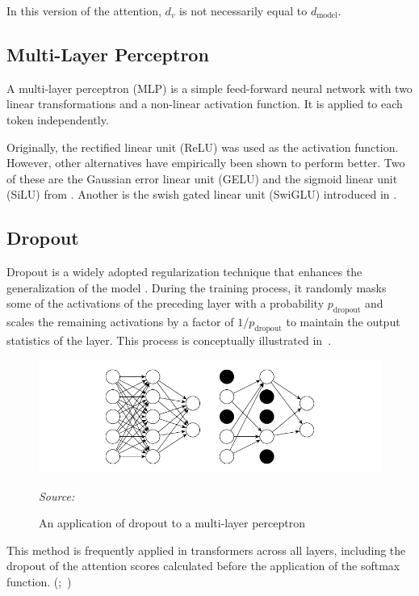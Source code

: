 In this version of the attention, \(d_v\) is not necessarily equal to \(d_{\mathrm{model}}\).

\subsection{Multi-Layer Perceptron}

A multi-layer perceptron (MLP) is a simple feed-forward neural network with two linear transformations and a non-linear activation function. It is applied to each token independently.

Originally, the rectified linear unit (ReLU) was used as the activation function. However, other alternatives have empirically been shown to perform better. Two of these are the Gaussian error linear unit (GELU) and the sigmoid linear unit (SiLU) from \citet{hendrycks2016}. Another is the swish gated linear unit (SwiGLU) introduced in \citet{shazeer2020}.

\subsection{Dropout}

Dropout is a widely adopted regularization technique that enhances the generalization of the model \parencite{srivastava2014}. During the training process, it randomly masks some of the activations of the preceding layer with a probability \(p_{\mathrm{dropout}}\) and scales the remaining activations by a factor of \(1 / p_{\mathrm{dropout}}\) to maintain the output statistics of the layer. This process is conceptually illustrated in~.

\begin{figure}[ht]
    \centering
    \includegraphics[width=\textwidth]{figures/dropout.pdf}
    \caption{An application of dropout to a multi-layer perceptron}\label{fig:dropout}
    \hfill\textit{Source: \citet{labach2019}}
\end{figure}

This method is frequently applied in transformers across all layers, including the dropout of the attention scores calculated before the application of the softmax function. (\cite{vaswani2017};~\cite{zehui2019})

